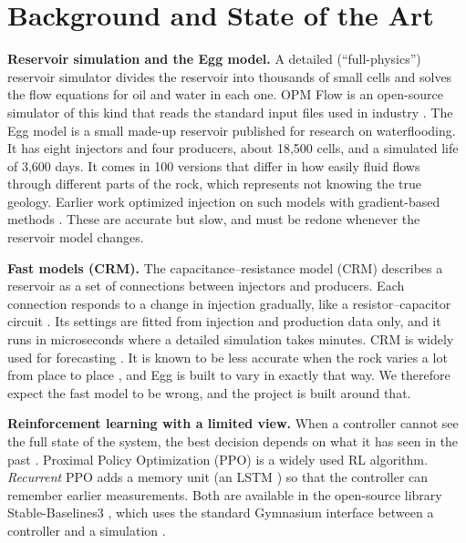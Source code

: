 \documentclass[11pt,letterpaper]{article}
\begin{document}

\section{Background and State of the Art}

\textbf{Reservoir simulation and the Egg model.} A detailed (``full-physics'') reservoir
simulator divides the reservoir into thousands of small cells and solves the flow equations
for oil and water in each one. OPM Flow is an open-source simulator of this kind that reads
the standard input files used in industry \cite{rasmussen2021opm}. The Egg model
\cite{jansen2014egg,egg2014dataset} is a small made-up reservoir published for research on
waterflooding. It has eight injectors and four producers, about 18,500 cells, and a
simulated life of 3,600 days. It comes in 100 versions that differ in how easily fluid
flows through different parts of the rock, which represents not knowing the true geology.
Earlier work optimized injection on such models with gradient-based methods
\cite{brouwer2004dynamic}. These are accurate but slow, and must be redone whenever the
reservoir model changes.

\textbf{Fast models (CRM).} The capacitance--resistance model (CRM) describes a reservoir
as a set of connections between injectors and producers. Each connection responds to a
change in injection gradually, like a resistor--capacitor circuit
\cite{yousef2006crm,sayarpour2009crm}. Its settings are fitted from injection and
production data only, and it runs in microseconds where a detailed simulation takes
minutes. CRM is widely used for forecasting \cite{soroush2018crmreview}. It is known to be
less accurate when the rock varies a lot from place to place \cite{mamghaderi2021crm}, and
Egg is built to vary in exactly that way. We therefore expect the fast model to be wrong,
and the project is built around that.

\textbf{Reinforcement learning with a limited view.} When a controller cannot see the full
state of the system, the best decision depends on what it has seen in the past
\cite{kaelbling1998pomdp}. Proximal Policy Optimization (PPO) \cite{schulman2017ppo} is a
widely used RL algorithm. \emph{Recurrent} PPO adds a memory unit (an LSTM
\cite{hochreiter1997lstm}) so that the controller can remember earlier measurements. Both
are available in the open-source library Stable-Baselines3 \cite{raffin2021sb3}, which
uses the standard Gymnasium interface between a controller and a simulation
\cite{towers2024gymnasium}.
\end{document}
